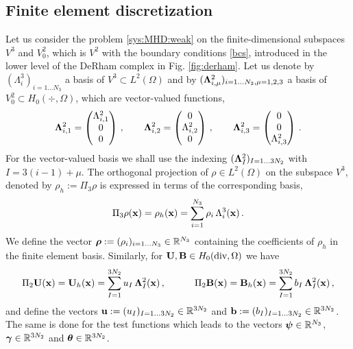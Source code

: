\documentclass[11pt]{amsart}
\begin{document}
\subsection{Finite element discretization}
Let us consider the problem \eqref{sys:MHD:weak} on the finite-dimensional subspaces $V^3$ and 
$V^2_0$, which is $V^2$ with the boundary conditions \eqref{bcs}, introduced in the lower level of 
the DeRham complex in Fig. \ref{fig:derham}. Let us denote by $(\Lambda^3_i)_{i = 1\ldots N_3}$ a 
basis of $V^3 \subset L^2(\Omega)$ and by $(\boldsymbol{\Lambda}^2_{i,\mu})_{i=1\ldots N_2,\mu=1,2,3}$ a basis of 
$V^2_0 \subset H_0(\div,\Omega)$, which are vector-valued functions,
$$
 \boldsymbol{\Lambda}^2_{i,1} = \begin{pmatrix}
                  \Lambda^2_{i,1} \\ 0 \\ 0
                 \end{pmatrix}\,,\qquad
 \boldsymbol{\Lambda}^2_{i,2} = \begin{pmatrix}
                  0 \\ \Lambda^2_{i,2} \\ 0
                 \end{pmatrix}\,,\qquad
 \boldsymbol{\Lambda}^2_{i,3} = \begin{pmatrix}
                  0 \\ 0 \\ \Lambda^2_{i,3}
                 \end{pmatrix}\,.
$$
For the vector-valued basis we shall use the indexing $(\boldsymbol{\Lambda}^2_I)_{I=1\ldots 3 N_2}$ with $I= 
3(i-1)+\mu$. The orthogonal projection of $\rho \in L^2(\Omega)$ on the subspace $V^3$, denoted 
by $\rho_h := \Pi_3 \rho$ is expressed in terms of the corresponding basis,
$$
 \Pi_3 \rho(\mathbf{x}) = \rho_h(\mathbf{x}) = \sum_{i=1}^{N_3} \rho_i\,\Lambda^3_i(\mathbf{x})\,.
$$
We define the vector $ \boldsymbol{\rho} :=(\rho_i)_{i=1\ldots N_3} \in \mathbb{R}^{N_3}$ containing the coefficients 
of $\rho_h$ in the finite element basis. Similarly, for $\mathbf{U},\mathbf{B} \in H_0(\textnormal{div},\Omega)$ we have
$$
 \Pi_2 \mathbf{U}(\mathbf{x}) = \mathbf{U}_h(\mathbf{x}) = \sum_{I=1}^{3N_2} u_I\,\boldsymbol{\Lambda}^2_I(\mathbf{x})\,,\qquad\quad \Pi_2 \mathbf{B}(\mathbf{x}) = 
\mathbf{B}_h(\mathbf{x}) = \sum_{I=1}^{3N_2} b_I\,\boldsymbol{\Lambda}^2_I(\mathbf{x})\,,
$$
and define the vectors $\mathbf{u} :=(u_I)_{I=1\ldots 3N_2}\in \mathbb{R}^{3N_2}$ and $\mathbf{b} :=(b_I)_{I=1\ldots 
3N_2}\in \mathbb{R}^{3N_2}$. The same is done for the test functions which leads to the vectors $\boldsymbol{\psi} \in 
\mathbb{R}^{N_3}$, $\boldsymbol{\gamma} \in \mathbb{R}^{3N_2}$ and $\boldsymbol{\theta} \in \mathbb{R}^{3N_2}$.





\end{document}
